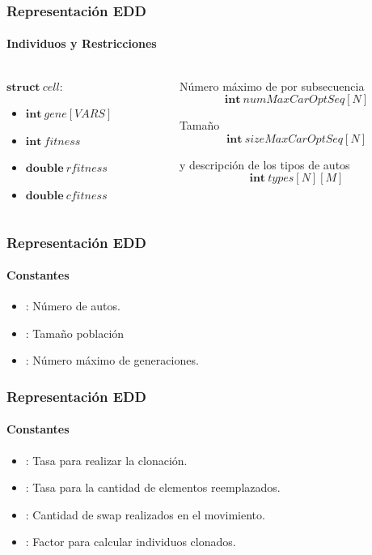 \frame
{
\frametitle{Representación EDD}
\framesubtitle{Individuos y Restricciones}
\begin{columns}
    \begin{column}{0.3\textwidth}
    $\textbf{struct}\ cell$:

        \begin{itemize}
            \item $\textbf{int}\ gene[VARS]$
            \item $\textbf{int}\ fitness$
            \item $\textbf{double}\ rfitness$
            \item $\textbf{double}\ cfitness$
        \end{itemize}
    \end{column}
    \begin{column}{0.7\textwidth}
        Número máximo de  por subsecuencia
        $$\textbf{int}\ numMaxCarOptSeq[N]$$

        Tamaño 
        $$\textbf{int}\ sizeMaxCarOptSeq[N]$$

         y descripción de los tipos de autos
        $$\textbf{int}\ types[N][M]$$
    \end{column}
\end{columns}
}

\frame
{
\frametitle{Representación EDD}
\framesubtitle{Constantes}
        \begin{itemize}
            \item {}: Número de autos.
            \item {}: Tamaño población
            \item {}: Número máximo de generaciones.
        \end{itemize}
}
\frame
{
\frametitle{Representación EDD}
\framesubtitle{Constantes}
        \begin{itemize}
            \item {}: Tasa para realizar la clonación.
            \item {}: Tasa para la cantidad de elementos reemplazados.
            \item {}: Cantidad de swap realizados en el movimiento.
            \item {}: Factor para calcular individuos clonados.
        \end{itemize}
}
        
